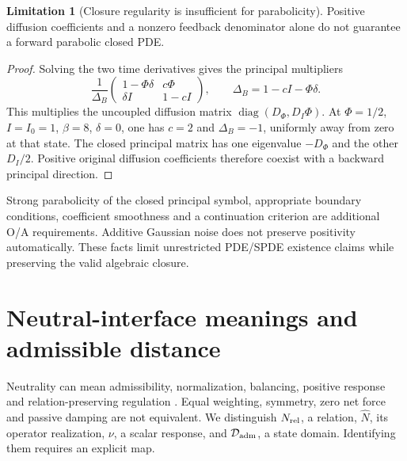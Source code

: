 \documentclass[11pt,letterpaper]{article}
\newcommand{\diag}{\operatorname{diag}}
\theoremstyle{definition}
\newtheorem{limitation}[theorem]{Limitation}
\numberwithin{equation}{section}
\begin{document}
\begin{limitation}[Closure regularity is insufficient for parabolicity]\label{parabolic}
Positive diffusion coefficients and a nonzero feedback denominator alone do not guarantee a forward parabolic closed PDE.
\end{limitation}
\begin{proof}
Solving the two time derivatives gives the principal multipliers
\begin{equation}
\frac1{\Delta_B}
\begin{pmatrix}1-\Phi\delta&c\Phi\\ \delta I&1-cI\end{pmatrix},
\qquad \Delta_B=1-cI-\Phi\delta.
\end{equation}
This multiplies the uncoupled diffusion matrix $\diag(D_\Phi,D_I\Phi)$. At $\Phi=1/2$, $I=I_0=1$, $\beta=8$, $\delta=0$, one has $c=2$ and $\Delta_B=-1$, uniformly away from zero at that state. The closed principal matrix has one eigenvalue $-D_\Phi$ and the other $D_I/2$. Positive original diffusion coefficients therefore coexist with a backward principal direction.
\end{proof}
Strong parabolicity of the closed principal symbol, appropriate boundary conditions, coefficient smoothness and a continuation criterion are additional O/A requirements. Additive Gaussian noise does not preserve positivity automatically. These facts limit unrestricted PDE/SPDE existence claims while preserving the valid algebraic closure.

\section{Neutral-interface meanings and admissible distance}
Neutrality can mean admissibility, normalization, balancing, positive response and relation-preserving regulation \cite{level0}. Equal weighting, symmetry, zero net force and passive damping are not equivalent. We distinguish $N_{\rm rel}$, a relation, $\widehat N$, its operator realization, $\nu$, a scalar response, and $\mathcal D_{\rm adm}$, a state domain. Identifying them requires an explicit map.
\end{document}
